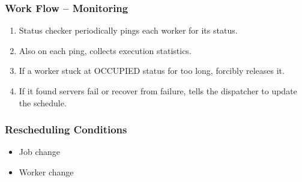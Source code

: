 \begin{frame}
  \frametitle{Work Flow -- Monitoring}
  \begin{enumerate}
    \item Status checker periodically pings each worker for its status.
    \item Also on each ping, collects execution statistics.
    \item If a worker stuck at OCCUPIED status for too long, forcibly
      releases it.
    \item If it found servers fail or recover from failure, tells the
      dispatcher to update the schedule.
  \end{enumerate}
\end{frame}
\begin{frame}
  \frametitle{Rescheduling Conditions}
  \begin{itemize}
    \item Job change
    \item Worker change
  \end{itemize}
\end{frame}
